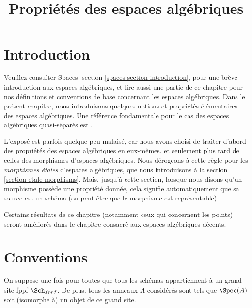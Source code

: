 

%


\title{Propriétés des espaces algébriques}


\maketitle

\label{section-phantom}

\tableofcontents

\section{Introduction}
\label{section-introduction}

\noindent
Veuillez consulter
Spaces, section \ref{spaces-section-introduction},
pour une brève introduction aux espaces algébriques, et lire aussi
une partie de ce chapitre pour nos définitions et conventions de base
concernant les espaces algébriques. Dans le présent chapitre, nous introduisons
quelques notions et propriétés élémentaires des espaces algébriques. Une référence
fondamentale pour le cas des espaces algébriques quasi-séparés est
\cite{Kn}.

\medskip\noindent
L'exposé est parfois quelque peu malaisé, car nous avons choisi
de traiter d'abord des propriétés des espaces algébriques
en eux-mêmes, et seulement plus tard de celles des morphismes d'espaces
algébriques. Nous dérogeons à cette règle pour les
{\it morphismes étales} d'espaces algébriques, que nous introduisons à la
section \ref{section-etale-morphisms}.
Mais, jusqu'à cette section, lorsque nous disons qu'un morphisme possède une propriété donnée,
cela signifie automatiquement que sa source est un schéma (ou peut-être que
le morphisme est représentable).

\medskip\noindent
Certains résultats de ce chapitre (notamment ceux qui concernent les points)
seront améliorés dans le chapitre consacré aux espaces algébriques décents.


\section{Conventions}
\label{section-conventions}

\noindent
On suppose une fois pour toutes que tous les schémas appartiennent à
un grand site fppf $\Sch_{fppf}$. De plus, tous les anneaux $A$ considérés
sont tels que $\Spec(A)$ soit (isomorphe à) un
objet de ce grand site.

